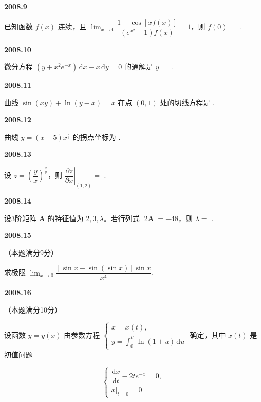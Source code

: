 \documentclass[UTF8,12pt,fontset=windows]{ctexart}
\begin{document}
\vfill
\newpage
{\large\bfseries 2008.9}

已知函数 $f(x)$ 连续，且 $\lim_{x \to 0} \dfrac{1 - \cos[x f(x)]}{(e^{x^2} - 1) f(x)} = 1$，则 $f(0) =$ \underline{\hspace{20mm}}.

\vfill
\newpage
{\large\bfseries 2008.10}

微分方程 $(y + x^2 e^{-x}) \,\mathrm{d}x - x \,\mathrm{d}y = 0$ 的通解是 $y =$ \underline{\hspace{20mm}}.

\vfill
\newpage
{\large\bfseries 2008.11}

曲线 $\sin(xy) + \ln(y - x) = x$ 在点 $(0, 1)$ 处的切线方程是 \underline{\hspace{20mm}}.

\vfill
\newpage
{\large\bfseries 2008.12}

曲线 $y = (x - 5) x^{\frac{2}{3}}$ 的拐点坐标为 \underline{\hspace{20mm}}.

\vfill
\newpage
{\large\bfseries 2008.13}

设 $z = \left(\dfrac{y}{x}\right)^{\frac{x}{y}}$，则 $\left. \dfrac{\partial z}{\partial x} \right|_{(1,2)} =$ \underline{\hspace{20mm}}.

\vfill
\newpage
{\large\bfseries 2008.14}

设3阶矩阵 $\boldsymbol{A}$ 的特征值为 $2, 3, \lambda$。若行列式 $|2\boldsymbol{A}| = -48$，则 $\lambda =$ \underline{\hspace{20mm}}.

\vfill
\newpage
{\large\bfseries 2008.15}

（本题满分9分）

求极限 $\lim_{x \to 0} \dfrac{[\sin x - \sin(\sin x)] \sin x}{x^4}$.

\vfill
\newpage
{\large\bfseries 2008.16}

（本题满分10分）

设函数 $y = y(x)$ 由参数方程 $\begin{cases} x = x(t), \\ y = \int_0^{t^2} \ln(1+u) \,\mathrm{d}u \end{cases}$ 确定，其中 $x(t)$ 是初值问题

$$
\begin{cases}
\dfrac{\mathrm{d}x}{\mathrm{d}t} - 2t e^{-x} = 0, \\[4pt]
x|_{t=0} = 0
\end{cases}
$$
\end{document}
